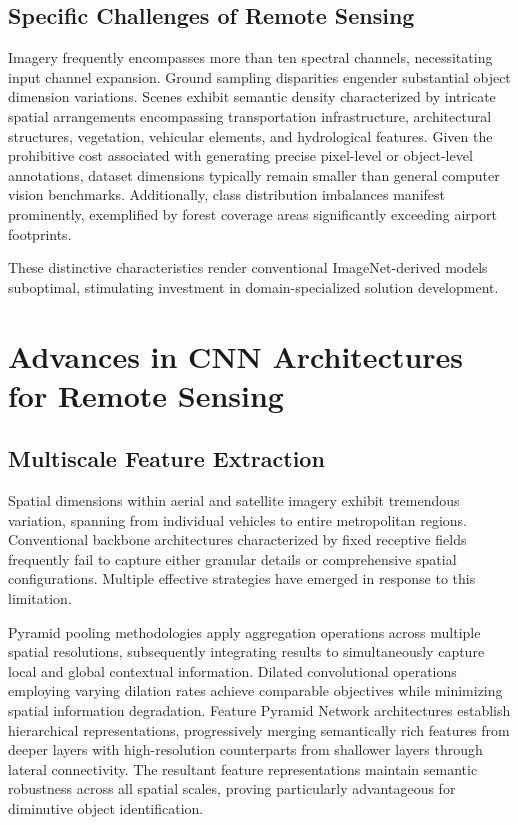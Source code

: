 \documentclass[12pt,a4paper]{article}
\begin{document}
\subsection{Specific Challenges of Remote Sensing}
Imagery frequently encompasses more than ten spectral channels, necessitating input channel expansion. Ground sampling disparities engender substantial object dimension variations. Scenes exhibit semantic density characterized by intricate spatial arrangements encompassing transportation infrastructure, architectural structures, vegetation, vehicular elements, and hydrological features. Given the prohibitive cost associated with generating precise pixel-level or object-level annotations, dataset dimensions typically remain smaller than general computer vision benchmarks. Additionally, class distribution imbalances manifest prominently, exemplified by forest coverage areas significantly exceeding airport footprints.

These distinctive characteristics render conventional ImageNet-derived models suboptimal, stimulating investment in domain-specialized solution development.

\section{Advances in CNN Architectures for Remote Sensing}
\label{sec:developments}
\subsection{Multiscale Feature Extraction}
Spatial dimensions within aerial and satellite imagery exhibit tremendous variation, spanning from individual vehicles to entire metropolitan regions. Conventional backbone architectures characterized by fixed receptive fields frequently fail to capture either granular details or comprehensive spatial configurations. Multiple effective strategies have emerged in response to this limitation.

Pyramid pooling methodologies apply aggregation operations across multiple spatial resolutions, subsequently integrating results to simultaneously capture local and global contextual information. Dilated convolutional operations employing varying dilation rates achieve comparable objectives while minimizing spatial information degradation. Feature Pyramid Network architectures establish hierarchical representations, progressively merging semantically rich features from deeper layers with high-resolution counterparts from shallower layers through lateral connectivity. The resultant feature representations maintain semantic robustness across all spatial scales, proving particularly advantageous for diminutive object identification.
\end{document}
